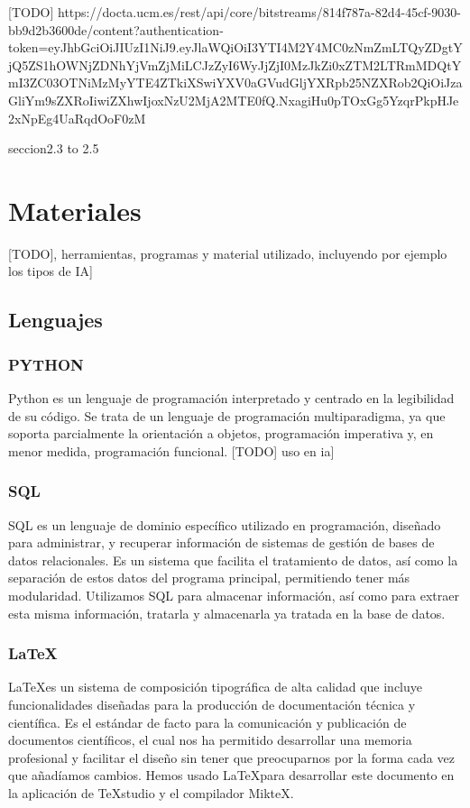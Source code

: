 


[TODO]
https://docta.ucm.es/rest/api/core/bitstreams/814f787a-82d4-45cf-9030-bb9d2b3600de/content?authentication-token=eyJhbGciOiJIUzI1NiJ9.eyJlaWQiOiI3YTI4M2Y4MC0zNmZmLTQyZDgtYjQ5ZS1hOWNjZDNhYjVmZjMiLCJzZyI6WyJjZjI0MzJkZi0xZTM2LTRmMDQtYmI3ZC03OTNiMzMyYTE4ZTkiXSwiYXV0aGVudGljYXRpb25NZXRob2QiOiJzaGliYm9sZXRoIiwiZXhwIjoxNzU2MjA2MTE0fQ.NxagiHu0pTOxGg5YzqrPkpHJe2xNpEg4UaRqdOoF0zM

seccion2.3 to 2.5

\section{Materiales}

[TODO], herramientas, programas y material utilizado, incluyendo por ejemplo los tipos de IA]

\subsection{Lenguajes} 

\subsubsection*{PYTHON}
Python es un lenguaje de programación interpretado y centrado en la legibilidad de su código. Se trata de un lenguaje de programación multiparadigma, ya que soporta parcialmente la orientación a objetos, programación imperativa y, en menor medida, programación funcional. [TODO] uso en ia]

\subsubsection*{SQL}
SQL es un lenguaje de dominio específico utilizado en programación, diseñado para administrar, y recuperar información de sistemas de gestión de bases de datos relacionales. Es un sistema que facilita el tratamiento de datos, así como la separación de estos datos del programa principal, permitiendo tener más modularidad.
Utilizamos SQL para almacenar información, así como para extraer esta misma información, tratarla y almacenarla ya tratada en la base de datos. 

\subsubsection*{\LaTeX} \label{latexDef}
\LaTeX\space es un sistema de composición tipográfica de alta calidad que incluye funcionalidades diseñadas para la producción de documentación técnica y científica. Es el estándar de facto para la comunicación y publicación de documentos científicos, el cual nos ha permitido desarrollar una memoria profesional y facilitar el diseño sin tener que preocuparnos por la forma cada vez que añadíamos cambios.       
Hemos usado \LaTeX\space para desarrollar este documento en la aplicación de TeXstudio y el compilador MikteX.

